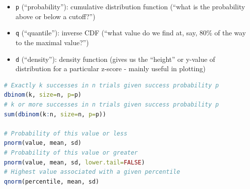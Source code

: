 \documentclass[10pt,landscape]{article}
\begin{document}
\begin{multicols}{4}
\begin{itemize}
    \item \texttt{p} (``probability''): cumulative distribution function (“what is the probability above or below a cutoff?”)
    \item \texttt{q} (``quantile''): inverse CDF (“what value do we find at, say, 80\% of the way to the maximal value?”)
    \item \texttt{d} (``density''): density function (gives us the “height” or y-value of distribution for a particular z-score - mainly useful in plotting)
\end{itemize}

\lstset{breaklines=true}
\begin{lstlisting}[language=R]
# Exactly k successes in n trials given success probability p
dbinom(k, size=n, p=p)
# k or more successes in n trials given success probability p
sum(dbinom(k:n, size=n, p=p))

# Probability of this value or less
pnorm(value, mean, sd)
# Probability of this value or greater
pnorm(value, mean, sd, lower.tail=FALSE)
# Highest value associated with a given percentile
qnorm(percentile, mean, sd)

\end{lstlisting}

\end{multicols}
\end{document}
